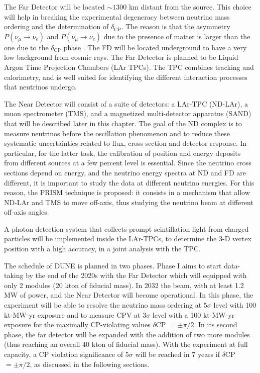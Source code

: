 The Far Detector will be located $\sim 1300$ km distant from the source. This choice will help in breaking the experimental degeneracy between neutrino mass ordering and the determination of $\delta_{\text{CP}}$. The reason is that the asymmetry $P(\nu_\mu \rightarrow \nu_e)$ and $P(\bar{\nu}_\mu \rightarrow \bar{\nu}_e)$ due to the presence of matter is larger than the one due to the $\delta_{\text{CP}}$ phase \cite{Bass_2015}\cite{DUNE_physics_motivations}. The FD will be located underground to have a very low background from cosmic rays. The Far Detector is planned to be Liquid Argon Time Projection Chambers (LAr TPCs).  
The TPC combines tracking and calorimetry, and is well suited for identifying the different interaction processes that neutrinos undergo.

The Near Detector will consist of a suite of detectors: a LAr-TPC (ND-LAr), a muon spectrometer (TMS), and a magnetized multi-detector apparatus (SAND) that will be described later in this chapter. The goal of the ND complex is to measure neutrinos before the oscillation phenomenon and to reduce these systematic uncertainties related to flux, cross section and detector response. In particular, for the latter task, the calibration of position and energy deposits from different sources at a few percent level is essential. 
Since the neutrino cross sections depend on energy, and the neutrino energy spectra at ND and FD are different, it is important to study the data at different neutrino energies. For this reason, the PRISM technique is proposed: it consists in a mechanism that allow ND-LAr and TMS to move off-axis, thus studying the neutrino beam at different off-axis angles.

A photon detection system that collects prompt scintillation light from charged particles will be implemented inside the LAr-TPCs, to determine the 3-D vertex position with a high accuracy, in a joint analysis with the TPC.

The schedule of DUNE is planned in two phases. Phase I aims to start data-taking by the end of the 2020s with the Far Detector which will equipped with only 2 modules (20 kton of fiducial mass). In 2032 the beam, with at least 1.2 MW of power, and the Near Detector will become operational. In this phase, the experiment will be able to resolve the neutrino mass ordering at 5$\sigma$ level with 100 kt-MW-yr exposure and to measure CPV at 3$\sigma$ level with a 100 kt-MW-yr exposure for the maximally CP-violating values $\delta$CP $= \pm \pi/2$. In its second phase, the far detector will be expanded with the addition of two more modules (thus reaching an overall 40 kton of fiducial mass). 
With the experiment at full capacity, a CP violation significance of 5$\sigma$ will be reached in 7 years if $\delta$CP $= \pm \pi/2$, as discussed in the following sections.

